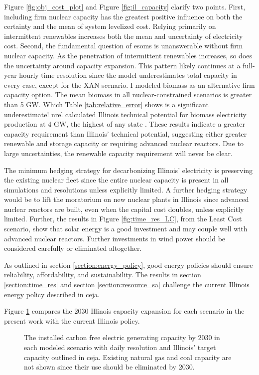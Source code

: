 Figure \ref{fig:obj_cost_plot} and Figure \ref{fig:il_capacity} clarify
two points. First, including firm nuclear capacity has the greatest positive
influence on both the certainty and the mean of system levelized cost. Relying primarily
on intermittent renewables increases both the mean and uncertainty of electricity cost.
Second, the fundamental question of \glspl{esom} is unanswerable without firm nuclear capacity.
As the penetration of intermittent renewables increases, so does the uncertainty around
capacity expansion. This pattern likely continues at a full-year hourly time resolution
since the model underestimates total capacity in every case, except for the XAN scenario.
I modeled biomass as an alternative firm capacity option. The mean biomass in all
nuclear-constrained scenarios is greater than 5 GW. Which Table \ref{tab:relative_error}
shows is a significant underestimate! \gls{nrel} calculated Illinois technical potential
for biomass electricity production at 4 GW, the highest of any state \cite{lopez_us_2012}.
These results indicate a greater capacity requirement than Illinois' technical potential,
suggesting either greater renewable and storage capacity or requiring advanced
nuclear reactors. Due to large uncertainties, the renewable capacity requirement
will never be clear.

The minimum hedging strategy for decarbonizing Illinois' electricity is preserving
the existing nuclear fleet since the entire nuclear capacity is present in all
simulations and resolutions unless explicitly limited. A further
hedging strategy would be to lift the moratorium on new nuclear plants in Illinois
since advanced nuclear reactors are built, even when the capital cost doubles, unless
explicitly limited. Further, the results in Figure \ref{fig:time_res_LC}, from the
Least Cost scenario, show that solar energy is a good investment and may couple well
with advanced nuclear reactors. Further investments in wind power should be
considered carefully or eliminated altogether.

As outlined in section \ref{section:energy_policy}, good energy policies should
ensure reliability, affordability, and sustainability. The results in section
\ref{section:time_res} and section \ref{section:resource_sa} challenge the
current Illinois energy policy described in \gls{ceja}.

Figure \ref{fig:compare_ceja} compares the 2030 Illinois capacity expansion
for each scenario in the present work with the current Illinois policy.

\begin{figure}[H]
  \centering
  \resizebox{0.85\columnwidth}{!}{}
  \caption{The installed carbon free electric generating capacity by 2030 in
  each modeled scenario with daily resolution and Illinois' target capacity outlined
  in \gls{ceja}. Existing natural gas and coal capacity are not shown since their
  use should be eliminated by 2030.}
  \label{fig:compare_ceja}
\end{figure}

